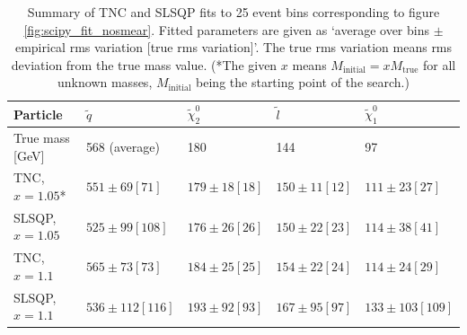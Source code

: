 \documentclass[twoside,english]{uiofysmaster}
\begin{document}
\begin{table}[hbt]
	\centering
	\begin{tabular}{| l | l | l | l | l |}
		\hline

		Particle   			& $\tilde q$ 	&$\tilde \chi_2^0$ 	& $\tilde l$ 	& $\tilde \chi_1^0$    	\\ \hline
		True mass [GeV]     & 568 (average) & 180				& 144			& 97					\\
		TNC, $x = 1.05$* &	$551 \pm 69 [71]$ & $179 \pm 18 [18]$ & $150 \pm 11 [12]$ & $111 \pm 23 [27]$ \\
		SLSQP, $x = 1.05$ &	$525 \pm 99 [108]$ & $176 \pm 26 [26]$ & $150 \pm 22 [23]$ & $114 \pm 38 [41]$ \\
		TNC, $x = 1.1$ &		$565 \pm 73 [73]$ & $184 \pm 25 [25]$ & $154 \pm 22 [24]$ & $114 \pm 24 [29]$ \\
		SLSQP, $x = 1.1$ &	$536 \pm 112 [116]$ & $193 \pm 92 [93]$ & $167 \pm 95 [97]$ & $133 \pm 103 [109]$ \\ \hline
	\end{tabular}
	\caption{Summary of TNC and SLSQP fits to 25 event bins corresponding to figure \ref{fig:scipy_fit_nosmear}. Fitted parameters are given as `average over bins $\pm$ empirical rms variation [true rms variation]'. The true rms variation means rms deviation from the true mass value. (*The given $x$ means $M_\mathrm{initial}= x M_\mathrm{true}$ for all unknown masses, $M_\mathrm{initial}$ being the starting point of the search.)}
	\label{table:herwig_scipy_comparison}
\end{table}
\end{document}
